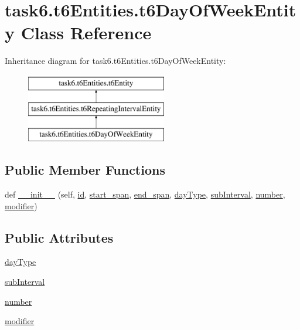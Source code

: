 \hypertarget{classtask6_1_1t6Entities_1_1t6DayOfWeekEntity}{}\section{task6.\+t6\+Entities.\+t6\+Day\+Of\+Week\+Entity Class Reference}
\label{classtask6_1_1t6Entities_1_1t6DayOfWeekEntity}
Inheritance diagram for task6.\+t6\+Entities.\+t6\+Day\+Of\+Week\+Entity\+:\begin{figure}[H]
\begin{center}
\leavevmode
\includegraphics[height=3.000000cm]{classtask6_1_1t6Entities_1_1t6DayOfWeekEntity}
\end{center}
\end{figure}
\subsection*{Public Member Functions}
\begin{DoxyCompactItemize}
\item 
def \hyperlink{classtask6_1_1t6Entities_1_1t6DayOfWeekEntity_a0d37c55b7b38be2c87ef400892cd8a2c}{\+\_\+\+\_\+init\+\_\+\+\_\+} (self, \hyperlink{classtask6_1_1t6Entities_1_1t6Entity_a96b2e7fb553c920ab2db6f6deb31e3b4}{id}, \hyperlink{classtask6_1_1t6Entities_1_1t6Entity_a8221c36d2995a24200cdfbd74cc9233c}{start\+\_\+span}, \hyperlink{classtask6_1_1t6Entities_1_1t6Entity_a597d42bb02fc9f42277098f0ce21917c}{end\+\_\+span}, \hyperlink{classtask6_1_1t6Entities_1_1t6DayOfWeekEntity_ac1bcc1717f9a956304df974931ff7a21}{day\+Type}, \hyperlink{classtask6_1_1t6Entities_1_1t6DayOfWeekEntity_a442dbffafa4e6e1a63e9d393faa24641}{sub\+Interval}, \hyperlink{classtask6_1_1t6Entities_1_1t6DayOfWeekEntity_a179b946a5572d6c8a0bc26ffd84fbbaf}{number}, \hyperlink{classtask6_1_1t6Entities_1_1t6DayOfWeekEntity_a789217448aa90f12568474eb620a4abb}{modifier})
\end{DoxyCompactItemize}
\subsection*{Public Attributes}
\begin{DoxyCompactItemize}
\item 
\hyperlink{classtask6_1_1t6Entities_1_1t6DayOfWeekEntity_ac1bcc1717f9a956304df974931ff7a21}{day\+Type}
\item 
\hyperlink{classtask6_1_1t6Entities_1_1t6DayOfWeekEntity_a442dbffafa4e6e1a63e9d393faa24641}{sub\+Interval}
\item 
\hyperlink{classtask6_1_1t6Entities_1_1t6DayOfWeekEntity_a179b946a5572d6c8a0bc26ffd84fbbaf}{number}
\item 
\hyperlink{classtask6_1_1t6Entities_1_1t6DayOfWeekEntity_a789217448aa90f12568474eb620a4abb}{modifier}
\end{DoxyCompactItemize}


